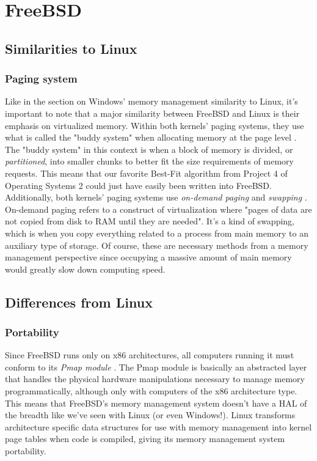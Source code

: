 \documentclass[letterpaper,10pt,draftclsnofoot,onecolumn,titlepage]{IEEEtran}
\begin{document}
\section{FreeBSD}
\subsection{Similarities to Linux}
\subsubsection{Paging system}
Like in the section on Windows' memory management similarity to Linux, it's important to note that a major similarity between FreeBSD and Linux is their emphasis on virtualized memory. Within both kernels' paging systems, they use what is called the "buddy system" when allocating memory at the page level \cite{freeBSD1} \cite{linux2}. The "buddy system" in this context is when a block of memory is divided, or \emph{partitioned}, into smaller chunks to better fit the size requirements of memory requests. This means that our favorite Best-Fit algorithm from Project 4 of Operating Systems 2 could just have easily been written into FreeBSD. Additionally, both kernels' paging systems use \emph{on-demand paging} and \emph{swapping} \cite{freeBSD2} \cite{linux1}. On-demand paging refers to a construct of virtualization where "pages of data are not copied from disk to RAM until they are needed". It's a kind of swapping, which is when you copy everything related to a process from main memory to an auxiliary type of storage. Of course, these are necessary methods from a memory management perspective since occupying a massive amount of main memory would greatly slow down computing speed. 
\subsection{Differences from Linux}
\subsubsection{Portability}
Since FreeBSD runs only on x86 architectures, all computers running it must conform to its \emph{Pmap module} \cite{freeBSD1}. The Pmap module is basically an abstracted layer that handles the physical hardware manipulations necessary to manage memory programmatically, although only with computers of the x86 architecture type. This means that FreeBSD's memory management system doesn't have a HAL of the breadth like we've seen with Linux (or even Windows!). Linux transforms architecture specific data structures for use with memory management into kernel page tables when code is compiled, giving its memory management system portability. 
\end{document}
